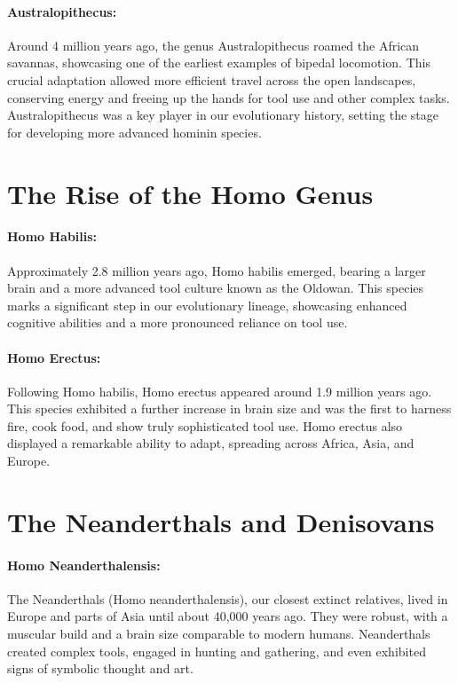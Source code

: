 \documentclass{book}
\begin{document}
\paragraph{Australopithecus:}
Around 4 million years ago, the genus Australopithecus roamed the African savannas, showcasing one of the earliest examples of bipedal locomotion. This crucial adaptation allowed more efficient travel across the open landscapes, conserving energy and freeing up the hands for tool use and other complex tasks. Australopithecus was a key player in our evolutionary history, setting the stage for developing more advanced hominin species.

\section*{The Rise of the Homo Genus}

\paragraph{Homo Habilis:}
Approximately 2.8 million years ago, Homo habilis emerged, bearing a larger brain and a more advanced tool culture known as the Oldowan. This species marks a significant step in our evolutionary lineage, showcasing enhanced cognitive abilities and a more pronounced reliance on tool use.

\paragraph{Homo Erectus:}
Following Homo habilis, Homo erectus appeared around 1.9 million years ago. This species exhibited a further increase in brain size and was the first to harness fire, cook food, and show truly sophisticated tool use. Homo erectus also displayed a remarkable ability to adapt, spreading across Africa, Asia, and Europe.

\section*{The Neanderthals and Denisovans}

\paragraph{Homo Neanderthalensis:}
The Neanderthals (Homo neanderthalensis), our closest extinct relatives, lived in Europe and parts of Asia until about 40,000 years ago. They were robust, with a muscular build and a brain size comparable to modern humans. Neanderthals created complex tools, engaged in hunting and gathering, and even exhibited signs of symbolic thought and art.
\end{document}
